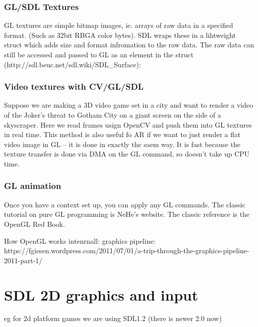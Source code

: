 \documentclass[oneside,english]{scrbook}
\begin{document}



\subsection{GL/SDL Textures}

GL textures are simple bitmap images, ie. arrays of raw data in a specified format. (Such as 32bit RBGA color bytes).  SDL wraps these in a lihtweight struct which adds size and format infromation to the raw data. The raw data can still be accessed and passed to GL as an element in the struct (http://sdl.beuc.net/sdl.wiki/SDL_Surface):



\subsection{Video textures with CV/GL/SDL}

Suppose we are making a 3D video game set in a city and want to render a video of the Joker's threat to Gotham City on a giant screen on the side of a skyscraper.   Here we read frames usign OpenCV and push them into GL textures in real time.   This method is also useful fo AR if we want to just render a flat video image in GL -- it is done in exactly the saem way.  It is fast because the texture transfer is done via DMA on the GL command, so doesn't take up CPU time.



\subsection{GL animation}

Once you have a context set up, you can apply any GL commands. The classic tutorial on pure GL programming is NeHe's website.  The classic reference is the OpenGL Red Book.

How OpenGL works intenrnall: graphics pipeline: https://fgiesen.wordpress.com/2011/07/01/a-trip-through-the-graphics-pipeline-2011-part-1/

\chapter{SDL 2D graphics and input}
eg for 2d platform games
we are using SDL1.2 (there is newer 2.0 now)
\end{document}
